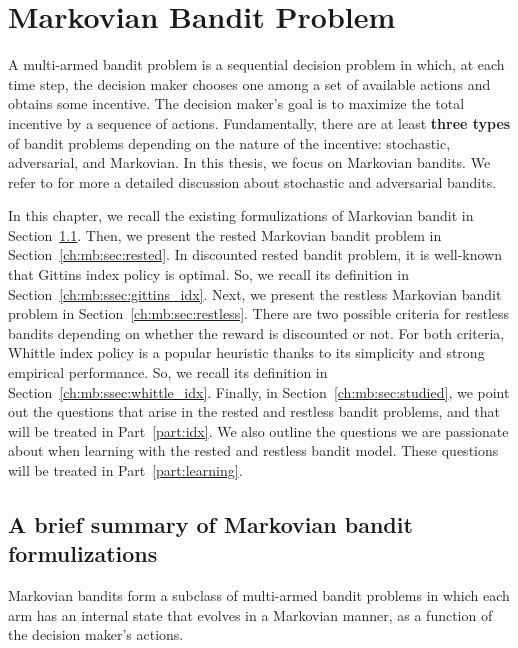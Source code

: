\begingroup
\let\clearpage\relax

\chapter{Markovian Bandit Problem}
\label{ch:mb}

A multi-armed bandit problem is a sequential decision problem in which, at each time step, the decision maker chooses one among a set of available actions and obtains some incentive.
The decision maker's goal is to maximize the total incentive by a sequence of actions.
Fundamentally, there are at least \textbf{three types} of bandit problems depending on the nature of the incentive: stochastic, adversarial, and Markovian.
In this thesis, we focus on Markovian bandits.
We refer to \cite{bubeck2012regret} for more a detailed discussion about stochastic and adversarial bandits.

In this chapter, we recall the existing formulizations of Markovian bandit in Section~\ref{ch:mb:sec:summary}.
Then, we present the rested Markovian bandit problem in Section~\ref{ch:mb:sec:rested}.
In discounted rested bandit problem, it is well-known that Gittins index policy is optimal.
So, we recall its definition in Section~\ref{ch:mb:ssec:gittins_idx}.
Next, we present the restless Markovian bandit problem in Section~\ref{ch:mb:sec:restless}.
There are two possible criteria for restless bandits depending on whether the reward is discounted or not.
For both criteria, Whittle index policy is a popular heuristic thanks to its simplicity and strong empirical performance.
So, we recall its definition in Section~\ref{ch:mb:ssec:whittle_idx}.
Finally, in Section~\ref{ch:mb:sec:studied}, we point out the questions that arise in the rested and restless bandit problems, and that will be treated in Part~\ref{part:idx}.
We also outline the questions we are passionate about when learning with the rested and restless bandit model.
These questions will be treated in Part~\ref{part:learning}.

\section{A brief summary of Markovian bandit formulizations}
\label{ch:mb:sec:summary}

Markovian bandits form a subclass of multi-armed bandit problems in which each arm has an internal state that evolves in a Markovian manner, as a function of the decision maker’s actions.

